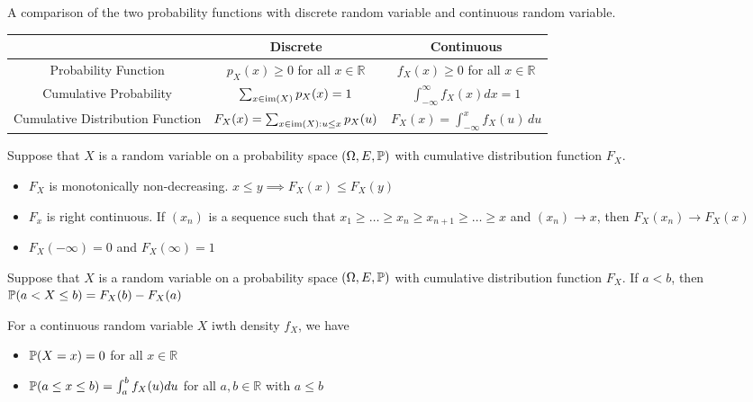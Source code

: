 \documentclass[a4paper]{article}
\begin{document}
\begin{thm}{}{} A comparison of the two probability functions with discrete random variable and continuous random variable. 
\begin{center}
\begin{tabular}{ |c|c|c| } 
 \hline
  & Discrete & Continuous \\ \hline
 Probability Function & $p_X(x)\geq0$ for all $x\in\mathbb{R}$ & $f_X(x)\geq0$ for all $x\in\mathbb{R}$ \\ \hline
 Cumulative Probability & $\sum_{x\in\operatorname{im}(X)}p_X(x)=1$ & $\int_{-\infty}^{\infty}f_X(x)dx=1$ \\ \hline
 Cumulative Distribution Function & $F_X(x)=\sum_{x\in\operatorname{im}(X):u\leq x}p_X(u)$ & $F_X(x)=\int_{-\infty}^{x}f_X(u)\, du$ \\ 
 \hline
\end{tabular}
\end{center}
\end{thm}


\begin{thm}{}{} Suppose that $X$ is a random variable on a probability space $(\Omega,E,\mathbb{P})$ with cumulative distribution function $F_X$. 
\begin{itemize}
\item $F_X$ is monotonically non-decreasing. $x\leq y\implies F_X(x)\leq F_X(y)$
\item $F_x$ is right continuous. If $(x_n)$ is a sequence such that $x_1\geq\dots\geq x_n\geq x_{n+1}\geq\dots\geq x$ and $(x_n)\to x$, then $F_X(x_n)\to F_X(x)$
\item $F_X(-\infty)=0$ and $F_X(\infty)=1$
\end{itemize}
\end{thm}


\begin{thm}{}{} Suppose that $X$ is a random variable on a probability space $(\Omega,E,\mathbb{P})$ with cumulative distribution function $F_X$. If $a<b$, then $\mathbb{P}(a<X\leq b)=F_X(b)-F_X(a)$
\end{thm}

\begin{thm}{}{} For a continuous random variable $X$ iwth density $f_X$, we have 
\begin{itemize}
\item $\mathbb{P}(X=x)=0$ for all $x\in\mathbb{R}$
\item $\mathbb{P}(a\leq x\leq b)=\int_{a}^{b}f_X(u)du$ for all $a,b\in\mathbb{R}$ with $a\leq b$
\end{itemize}
\end{thm}
\end{document}
